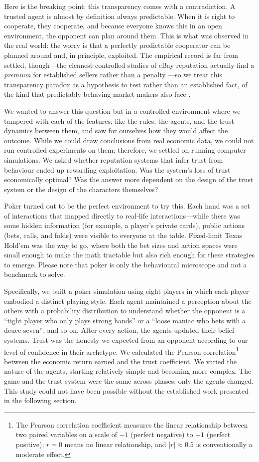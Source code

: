 \documentclass[10pt]{article} %
\begin{document}
Here is the breaking point: this transparency comes with a
contradiction. A trusted agent is almost by definition always
predictable. When it is right to cooperate, they cooperate, and
because everyone knows this in an open environment, the opponent
can plan around them. This is what was observed in the real
world: the worry is that a perfectly predictable cooperator can be
planned around and, in principle, exploited. The empirical record is
far from settled, though---the cleanest controlled studies of eBay
reputation actually find a \emph{premium} for established sellers
rather than a penalty \citep{resnick2002trust,bolton2004effective}---so
we treat this transparency paradox as a hypothesis to test rather
than an established fact, of the kind that predictably behaving
market-makers also face \citep{glosten1985bid}.

We wanted to answer this question but in a controlled environment
where we tampered with each of the features, like the rules, the
agents, and the trust dynamics between them, and saw for ourselves
how they would affect the outcome. While we could draw conclusions
from real economic data, we could not run controlled experiments
on them; therefore, we settled on running computer simulations. We
asked whether reputation systems that infer trust from behaviour
ended up rewarding exploitation. Was the system's loss of trust
economically optimal? Was the answer more dependent on the design
of the trust system or the design of the characters themselves?

Poker turned out to be the perfect environment to try this. Each
hand was a set of interactions that mapped directly to real-life
interactions---while there was some hidden information (for
example, a player's private cards), public actions (bets, calls, and folds) were
visible to everyone at the table. Fixed-limit Texas
Hold'em was the way to go, where both the bet sizes and action
spaces were small enough to make the math tractable but also rich
enough for these strategies to emerge. Please note that poker is
only the behavioural microscope and not a benchmark to solve.

Specifically, we built a poker simulation using eight players in
which each player embodied a distinct playing style. Each agent
maintained a perception about the others with a probability
distribution to understand whether the opponent is a ``tight
player who only plays strong hands'' or a ``loose maniac who bets
with a deuce-seven'', and so on. After every action, the agents
updated their belief systems. Trust was the honesty we expected
from an opponent according to our level of confidence in their
archetype. We calculated the Pearson
correlation\footnote{The Pearson correlation coefficient measures
the linear relationship between two paired variables on a scale of
$-1$ (perfect negative) to $+1$ (perfect positive); $r = 0$ means
no linear relationship, and $|r| \approx 0.5$ is conventionally a
moderate effect.} between the economic return earned and the trust
coefficient. We varied the nature of the agents, starting
relatively simple and becoming more complex. The game and the
trust system were the same across phases; only the agents changed.
This study could not have been possible without the established
work presented in the following section.
\end{document}
